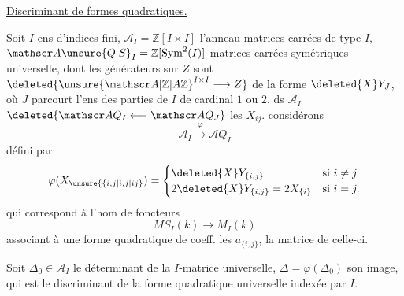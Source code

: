 \uline{Discriminant de formes quadratiques.}

Soit $I$ ens d'indices fini, $\mathscr A_I=\mathbb Z[I\times I]$ l'anneau    matrices carrées de type $I$, $\mathscr A\unsure{Q|S}_I=\mathbb Z[\operatorname{Sym}^2(I)]$   matrices carrées symétriques universelle,  dont les générateurs sur $Z$ sont $\deleted{{\unsure{\mathscr A|\mathbb Z|A\mathbb Z}}^{I\times I}\longrightarrow Z}$ de la forme $\deleted{X}Y_J$, où $J$ parcourt l'ens des parties de $I$ de cardinal $1$ ou $2$.  ds $\mathscr A_I$ $\deleted{\mathscr A Q_I\longleftarrow\mathscr A Q_J}$ les $X_{ij}$.  considérons
\[
\mathscr A_I\xrightarrow{\varphi}\mathscr A Q_I
\]
défini par
\[
\varphi(X_{\unsure{\{i,j|i,j|ij}})=
\begin{cases}
\deleted{X}Y_{\{i,j\}}&\text{si }i\ne j\\
2\deleted{X}Y_{\{i,j\}}=2X_{\{i\}}&\text{si }i=j.
\end{cases}
\]
qui  correspond à l'hom de foncteurs
\[
MS_I(k)\longrightarrow M_I(k)
\]
associant à une forme quadratique de coeff. les $a_{\{i,j\}}$, la matrice de celle-ci.

Soit $\Delta_0\in\mathscr A_I$ le déterminant de la $I$-matrice universelle, $\Delta=\varphi(\Delta_0)$ son image, qui est le discriminant de la forme quadratique universelle indexée par $I$.


